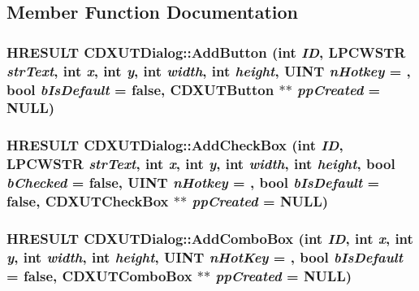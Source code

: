 \subsection{Member Function Documentation}
\hypertarget{class_c_d_x_u_t_dialog_acc5e5c07e3dbbb843a18d4974273d169}{
\subsubsection[{AddButton}]{\setlength{\rightskip}{0pt plus 5cm}HRESULT CDXUTDialog::AddButton ({\bf int} {\em ID}, \/  LPCWSTR {\em strText}, \/  {\bf int} {\em x}, \/  {\bf int} {\em y}, \/  {\bf int} {\em width}, \/  {\bf int} {\em height}, \/  UINT {\em nHotkey} = {}, \/  bool {\em bIsDefault} = {\ttfamily false}, \/  {\bf CDXUTButton} $\ast$$\ast$ {\em ppCreated} = {\ttfamily NULL})}}
\label{class_c_d_x_u_t_dialog_acc5e5c07e3dbbb843a18d4974273d169}
\hypertarget{class_c_d_x_u_t_dialog_a9b69134b9abab06bcf3e449ad7323733}{
\subsubsection[{AddCheckBox}]{\setlength{\rightskip}{0pt plus 5cm}HRESULT CDXUTDialog::AddCheckBox ({\bf int} {\em ID}, \/  LPCWSTR {\em strText}, \/  {\bf int} {\em x}, \/  {\bf int} {\em y}, \/  {\bf int} {\em width}, \/  {\bf int} {\em height}, \/  bool {\em bChecked} = {\ttfamily false}, \/  UINT {\em nHotkey} = {}, \/  bool {\em bIsDefault} = {\ttfamily false}, \/  {\bf CDXUTCheckBox} $\ast$$\ast$ {\em ppCreated} = {\ttfamily NULL})}}
\label{class_c_d_x_u_t_dialog_a9b69134b9abab06bcf3e449ad7323733}
\hypertarget{class_c_d_x_u_t_dialog_a5027ee1afa698e4273b44af289451d8e}{
\subsubsection[{AddComboBox}]{\setlength{\rightskip}{0pt plus 5cm}HRESULT CDXUTDialog::AddComboBox ({\bf int} {\em ID}, \/  {\bf int} {\em x}, \/  {\bf int} {\em y}, \/  {\bf int} {\em width}, \/  {\bf int} {\em height}, \/  UINT {\em nHotKey} = {}, \/  bool {\em bIsDefault} = {\ttfamily false}, \/  {\bf CDXUTComboBox} $\ast$$\ast$ {\em ppCreated} = {\ttfamily NULL})}}
